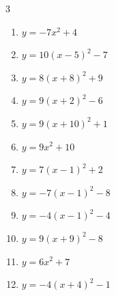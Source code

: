 \begin{multicols}{3}
\begin{enumerate}
  \item $\displaystyle y=-7x^{2}+4$

        \phantom{$\displaystyle 頂点\left( 0 , 4 \right)$}

  \item $\displaystyle y=10\left( x-5\right)^{2}-7$

        \phantom{$\displaystyle 頂点\left( 5 , -7 \right)$}

  \item $\displaystyle y=8\left( x+8\right)^{2}+9$

        \phantom{$\displaystyle 頂点\left( -8 , 9 \right)$}

  \item $\displaystyle y=9\left( x+2\right)^{2}-6$

        \phantom{$\displaystyle 頂点\left( -2 , -6 \right)$}

  \item $\displaystyle y=9\left( x+10\right)^{2}+1$

        \phantom{$\displaystyle 頂点\left( -10 , 1 \right)$}

  \item $\displaystyle y=9x^{2}+10$

        \phantom{$\displaystyle 頂点\left( 0 , 10 \right)$}

  \item $\displaystyle y=7\left( x-1\right)^{2}+2$

        \phantom{$\displaystyle 頂点\left( 1 , 2 \right)$}

  \item $\displaystyle y=-7\left( x-1\right)^{2}-8$

        \phantom{$\displaystyle 頂点\left( 1 , -8 \right)$}

\columnbreak %

  \item $\displaystyle y=-4\left( x-1\right)^{2}-4$

        \phantom{$\displaystyle 頂点\left( 1 , -4 \right)$}

  \item $\displaystyle y=9\left( x+9\right)^{2}-8$

        \phantom{$\displaystyle 頂点\left( -9 , -8 \right)$}

  \item $\displaystyle y=6x^{2}+7$

        \phantom{$\displaystyle 頂点\left( 0 , 7 \right)$}

  \item $\displaystyle y=-4\left( x+4\right)^{2}-1$


\end{enumerate}
\end{multicols}
